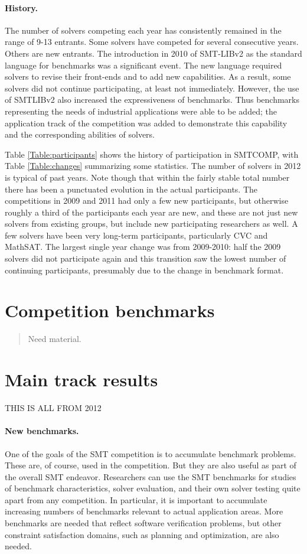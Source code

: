\documentclass[twosize,11pt]{article}
\newcommand{\tjark}[1]{\begin{quote}\sc #1\marginpar{\textcolor{red}{$\ast^{\mbox{TW}}$}}\end{quote}}
\newcommand{\tjarkx}[1]{\tjark{#1}}
\begin{document}
\paragraph{History.} The number of solvers competing each year has consistently remained in the range of 9-13 entrants.
Some solvers have competed for several consecutive years. Others are new entrants. The introduction in 2010 of SMT-LIBv2 as the standard language for benchmarks was a significant event. The new language required solvers to revise their front-ends and to add new capabilities.
As a result, some solvers did not continue participating, at least not immediately. However, the use of SMTLIBv2 also increased the expressiveness of benchmarks. Thus benchmarks representing the needs of industrial applications were able to be added; 
the application track of the competition was added to demonstrate this capability and the corresponding abilities of solvers.


Table \ref{Table:participants} shows the history of participation in SMTCOMP, with Table \ref{Table:changes} summarizing some statistics. The number of solvers in 2012 is typical of past years. Note though that within the fairly stable total number there has been a punctuated evolution in the actual participants. The competitions in 2009 and 2011 had only a few new participants, but otherwise roughly a third of the participants each year are new, and these are not just new solvers from existing groups, but include new participating researchers as well. A few solvers have been very long-term participants, particularly CVC and MathSAT. The largest single year change was from 2009-2010: half the 2009 solvers did not participate again and this transition saw the lowest number of continuing participants, presumably due to the change in benchmark format.

\section{Competition benchmarks}
\label{sec:benchmarks}

\tjarkx{Need material.}

\section{Main track results}
\label{sec:main-results}

THIS IS ALL FROM 2012

\paragraph{New benchmarks.} One of the goals of the SMT competition is to accumulate benchmark problems. These are, of course, used in the competition. But they are also useful as part of the overall SMT endeavor. Researchers can use the SMT benchmarks for studies of benchmark characteristics, solver evaluation, and their own solver testing quite apart from any competition. In particular, it is important to accumulate increasing numbers of benchmarks relevant to actual application areas. More benchmarks are needed that reflect software verification problems, but other constraint satisfaction domains, such as planning and optimization, are also needed.
\end{document}
